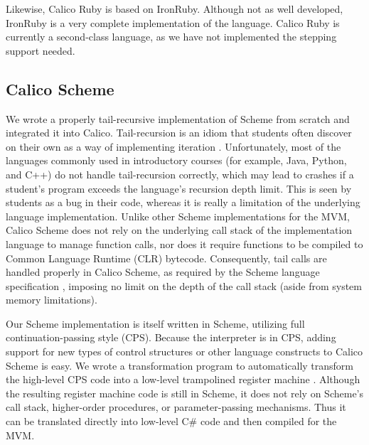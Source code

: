 \documentclass[preprint]{sigplanconf}
\begin{document}
Likewise, Calico Ruby is based on IronRuby. Although not as well
developed, IronRuby is a very complete implementation of the
language. Calico Ruby is currently a second-class language, as we have
not implemented the stepping support needed.

\subsection{Calico Scheme}

We wrote a properly tail-recursive implementation of Scheme from
scratch and integrated it into Calico.  Tail-recursion is an idiom
that students often discover on their own as a way of implementing
iteration \cite{blank-kumar-2010}. Unfortunately, most of the
languages commonly used in introductory courses (for example, Java,
Python, and C++) do not handle tail-recursion correctly, which may
lead to crashes if a student's program exceeds the language's
recursion depth limit. This is seen by students as a bug in their
code, whereas it is really a limitation of the underlying language
implementation. Unlike other Scheme implementations for the MVM,
Calico Scheme does not rely on the underlying call stack of the
implementation language to manage function calls, nor does it require
functions to be compiled to Common Language Runtime (CLR)
bytecode. Consequently, tail calls are handled properly in Calico
Scheme, as required by the Scheme language specification
\cite{sperber-etal-2010}, imposing no limit on the depth of the call
stack (aside from system memory limitations).

Our Scheme implementation is itself written in Scheme, utilizing full
continuation-passing style (CPS).  Because the interpreter is in CPS, adding
support for new types of control structures or other language constructs to
Calico Scheme is easy.  We wrote a transformation program to automatically
transform the high-level CPS code into a low-level trampolined register machine
\cite{EOPL3}.  Although the resulting register machine code is still in Scheme,
it does not rely on Scheme's call stack, higher-order procedures, or
parameter-passing mechanisms.  Thus it can be translated directly into
low-level C\# code and then compiled for the MVM.
 
\end{document}
